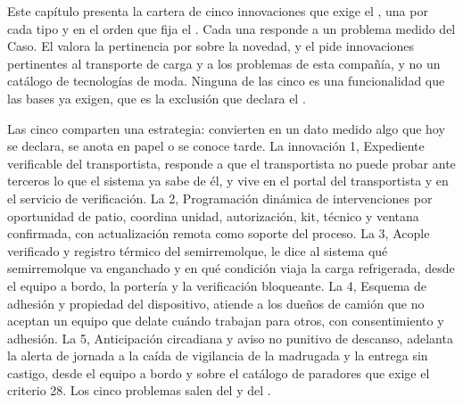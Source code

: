 %
\ProvideDocumentCommand{}
\ProvideDocumentCommand{}

Este capítulo presenta la cartera de cinco innovaciones que exige el , una por cada tipo
y en el orden que fija el . Cada una responde a un problema medido del Caso.
El  valora la pertinencia por sobre la novedad, y el  pide
innovaciones pertinentes al transporte de carga y a los problemas de esta compañía, y no un catálogo de
tecnologías de moda. Ninguna de las cinco es una funcionalidad que las bases ya exigen, que es la
exclusión que declara el .

Las cinco comparten una estrategia: convierten en un dato medido algo que hoy se declara, se anota en
papel o se conoce tarde. La innovación 1, Expediente
verificable del transportista, responde a que el transportista no puede probar ante terceros lo que el
sistema ya sabe de él, y vive en el portal del transportista y en el servicio de verificación. La 2,
Programación dinámica de intervenciones por oportunidad de patio, coordina unidad, autorización,
kit, técnico y ventana confirmada, con actualización remota como soporte del proceso. La 3, Acople verificado y registro térmico del semirremolque, le dice
al sistema qué semirremolque va enganchado y en qué condición viaja la carga refrigerada, desde el equipo
a bordo, la portería y la verificación bloqueante. La 4, Esquema de adhesión y propiedad del dispositivo, atiende a los dueños de
camión que no aceptan un equipo que delate cuándo trabajan para otros, con consentimiento y adhesión.
La 5, Anticipación circadiana y aviso no punitivo de descanso, adelanta la alerta de jornada a la caída
de vigilancia de la madrugada y la entrega sin castigo, desde el equipo a bordo y sobre el catálogo de
paradores que exige el criterio 28. Los cinco problemas salen
del  y del .

